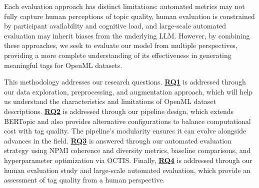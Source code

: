 Each evaluation approach has distinct limitations: automated metrics may not fully capture human perceptions of topic quality, human evaluation is constrained by participant availability and cognitive load, and large-scale automated evaluation may inherit biases from the underlying LLM. However, by combining these approaches, we seek to evaluate our model from multiple perspectives, providing a more complete understanding of its effectiveness in generating meaningful tags for OpenML datasets.

This methodology addresses our research questions. \hyperref[rq1]{\textbf{RQ1}} is addressed through our data exploration, preprocessing, and augmentation approach, which will help us understand the characteristics and limitations of OpenML dataset descriptions. \hyperref[rq2]{\textbf{RQ2}} is addressed through our pipeline design, which extends BERTopic and also provides alternative configurations to balance computational cost with tag quality. The pipeline's modularity ensures it can evolve alongside advances in the field. \hyperref[rq3]{\textbf{RQ3}} is answered through our automated evaluation strategy using NPMI coherence and diversity metrics, baseline comparisons, and hyperparameter optimization via OCTIS. Finally, \hyperref[rq4]{\textbf{RQ4}} is addressed through our human evaluation study and large-scale automated evaluation, which provide an assessment of tag quality from a human perspective.